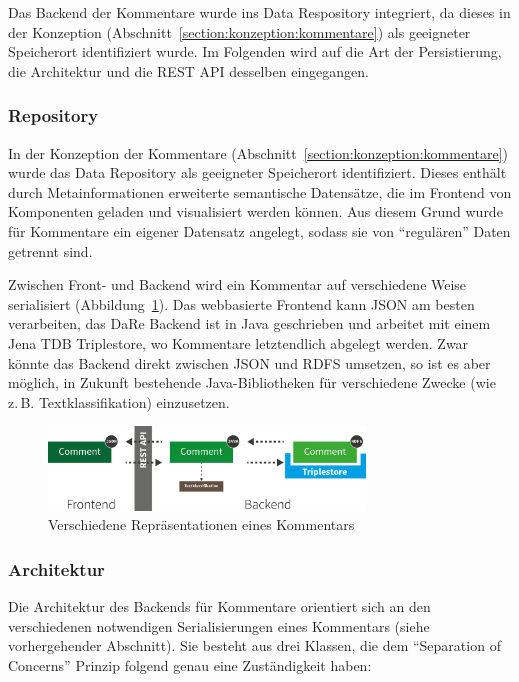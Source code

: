 \documentclass[
	headsepline,
	footsepline,
	fontsize=12pt,
	bibliography=totoc
]{scrbook}
\begin{document}
Das Backend der Kommentare wurde ins Data Respository integriert, da dieses in der Konzeption (Abschnitt~\ref{section:konzeption:kommentare}) als geeigneter Speicherort identifiziert wurde. Im Folgenden wird auf die Art der Persistierung, die Architektur und die REST API desselben eingegangen.

\subsubsection{Repository}

In der Konzeption der Kommentare (Abschnitt~\ref{section:konzeption:kommentare}) wurde das Data Repository als geeigneter Speicherort identifiziert. Dieses enthält durch Metainformationen erweiterte semantische Datensätze, die im Frontend von Komponenten geladen und visualisiert werden können. Aus diesem Grund wurde für Kommentare ein eigener Datensatz angelegt, sodass sie von \enquote{regulären} Daten getrennt sind.

Zwischen Front- und Backend wird ein Kommentar auf verschiedene Weise serialisiert (Abbildung~\ref{figure:kommentare-backend}). Das webbasierte Frontend kann JSON am besten verarbeiten, das DaRe Backend ist in Java geschrieben und arbeitet mit einem Jena TDB Triplestore, wo Kommentare letztendlich abgelegt werden. Zwar könnte das Backend direkt zwischen JSON und RDFS umsetzen, so ist es aber möglich, in Zukunft bestehende Java-Bibliotheken für verschiedene Zwecke (wie z.\,B. Textklassifikation) einzusetzen.

\begin{figure}[htbp]
   \centering
   \includegraphics[width=0.75\textwidth]{images/implementierung-kommentare-backend.png}
   \caption{Verschiedene Repräsentationen eines Kommentars}
   \label{figure:kommentare-backend}
\end{figure}

\subsubsection{Architektur}

Die Architektur des Backends für Kommentare orientiert sich an den verschiedenen notwendigen Serialisierungen eines Kommentars (siehe vorhergehender Abschnitt). Sie besteht aus drei Klassen, die dem \enquote{Separation of Concerns} Prinzip folgend genau eine Zuständigkeit haben:
\end{document}
